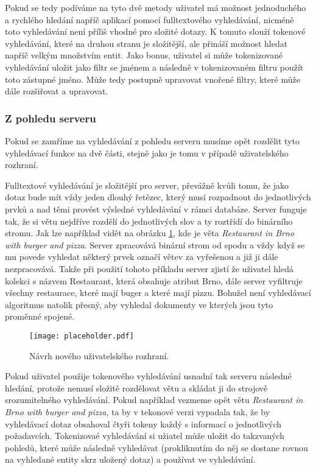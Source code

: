 \par Pokud se tedy podíváme na tyto dvě metody uživatel má možnost jednoduchého a rychlého hledání napříč aplikací pomocí fulltextového vyhledávání, nicméně toto vyhledávání není příliš vhodné pro složité dotazy. K tomuto slouží tokenové vyhledávání, které na druhou stranu je složitější, ale přináší možnost hledat napříč velkým množstvím entit. Jako bonus, uživatel si může tokenizované vyhledávání uložit jako filtr se jménem a následně v tokenizovaném filtru použít toto zástupné jméno. Může tedy postupně upravovat vnořené filtry, které může dále rozšiřovat a upravovat.

\subsubsection{Z pohledu serveru}
\par Pokud se zamříme na vyhledávání z pohledu serveru musíme opět rozdělit tyto vyhledávací funkce na dvě části, stejně jako je tomu v případě uživatelského rozhraní.

\par Fulltextové vyhledávání je složitější pro server, převážně kvůli tomu, že jako dotaz bude mít vždy jeden dlouhý řetězec, který musí rozpadnout do jednotlivých prvků a nad těmi provést výsledné vyhledávání v rámci databáze. Server funguje tak, že si větu nejdříve rozdělí do jednotlivých slov a ty roztřídí do binárního stromu. Jak lze například vidět na obrázku \ref{binarni-strom}, kde je věta \textit{Restaurant in Brno with burger and pizza}. Server zpracovává binární strom od spodu a vždy když se mu povede vyhledat některý prvek označí větev za vyřešenou a již ji dále nezpracovává. Takže při použití tohoto příkladu server zjistí že uživatel hledá kolekci s názvem Restaurant, která obsahuje atribut Brno, dále server vyfiltruje všechny restaurace, které mají buger a které mají pizzu. Bohužel není vyhledávací algoritmus natolik přesný, aby vyhledal dokumenty ve kterých jsou tyto proměnné spojené.

\begin{figure}[htp]
  \centering
  \texttt{[image: placeholder.pdf]}
  \caption{Návrh nového uživatelského rozhraní.}
  \label{binarni-strom}
\end{figure}

\par Pokud uživatel použije tokenového vyhledávání usnadní tak serveru následné hledání, protože nemusí složitě rozdělovat větu a skládat ji do strojově srozumitelného vyhledávání. Pokud například vezmeme opět větu \textit{Restaurant in Brno with burger and pizza}, ta by v tekonové verzi vypadala tak, že by vyhledávací dotaz obsahoval čtyři tokeny každý s informací o jednotlivých požadavcích. Tokenizovaé vyhledávání si užiatel může uložit do takzvaných pohledů, které může následně vyhledávat (prokliknutím do něj se dostane rovnou na vyhledané entity skrz uložený dotaz) a používat ve vyhledávání.

